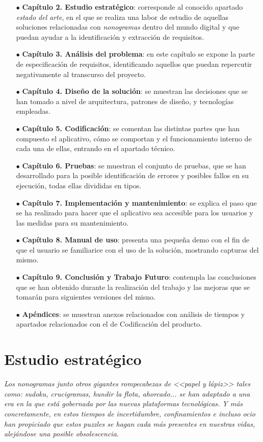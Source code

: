 \documentclass[11pt,spanish,listoffigures,listoftables]{tfgetsinf}
\begin{document}
\begin{itemize}
   \item[$\bullet$] \textbf{Capítulo 2. Estudio estratégico}: corresponde al conocido apartado \textit{estado del arte}, en el que se realiza una labor 
   de estudio de aquellas soluciones relacionadas con \textit{nonogramas} dentro del mundo digital y que puedan ayudar a la identificación y extracción de requisitos.
   \item[$\bullet$] \textbf{Capítulo 3. Análisis del problema}: en este capítulo se expone la parte de especificación de requisitos,
    identificando aquellos que puedan repercutir negativamente al transcurso del proyecto.
   \item[$\bullet$] \textbf{Capítulo 4. Diseño de la solución}: se muestran las decisiones que se han tomado a nivel de arquitectura, patrones de diseño, 
   y tecnologías empleadas.
   \item[$\bullet$] \textbf{Capítulo 5. Codificación}: se comentan las distintas partes que han compuesto el aplicativo, cómo se comportan y 
   el funcionamiento interno de cada una de ellas, entrando en el apartado técnico.
   \item[$\bullet$] \textbf{Capítulo 6. Pruebas}: se muestran el conjunto de pruebas, que se han desarrollado para la posible identificación de 
   errores y posibles fallos en su ejecución, todas ellas divididas en tipos. 
   \item[$\bullet$] \textbf{Capítulo 7. Implementación y mantenimiento}: se explica el paso que se ha realizado para hacer que el aplicativo sea accesible
   para los usuarios y las medidas para su mantenimiento. 
   \item[$\bullet$] \textbf{Capítulo 8. Manual de uso}: presenta una pequeña demo con el fin de que el usuario se familiarice con el uso de
   la solución, mostrando capturas del mismo.
   \item[$\bullet$] \textbf{Capítulo 9. Conclusión y Trabajo Futuro}: contempla las conclusiones que se han obtenido durante la realización del trabajo y
   las mejoras que se tomarán para siguientes versiones del misno.
   \item[$\bullet$] \textbf{Apéndices}: se muestran anexos relacionados con análisis de tiempos y apartados relacionados con el de Codificación del
   producto.
\end{itemize}


\chapter{Estudio estratégico}
\textit{Los \textit{nonogramas} junto otros gigantes rompecabezas de <<papel y lápiz>> tales como: sudoku, crucigramas, hundir la flota, ahorcado... se han adaptado a
una era en la que está gobernada por las nuevas plataformas tecnológicas. Y más concretamente, en estos tiempos de incertidumbre, confinamientos e incluso ocio han propiciado que estos
puzzles se hagan cada más presentes en nuestras vidas, alejándose una posible obsolescencia.}
\end{document}
